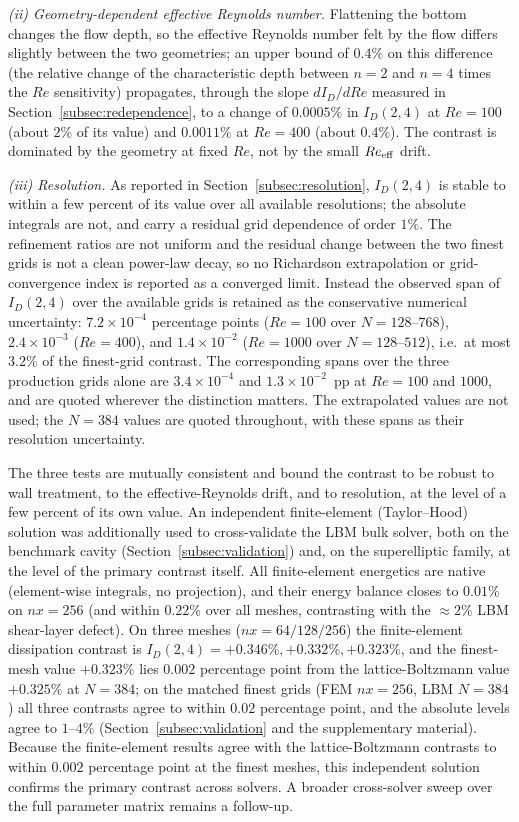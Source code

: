\emph{(ii) Geometry-dependent effective Reynolds number.} Flattening the bottom changes the flow depth, so the effective Reynolds number felt by the flow differs slightly between the two geometries; an upper bound of $0.4\%$ on this difference (the relative change of the characteristic depth between $n=2$ and $n=4$ times the $Re$ sensitivity) propagates, through the slope $dI_D/dRe$ measured in Section~\ref{subsec:redependence}, to a change of $0.0005\%$ in $I_D(2,4)$ at $Re=100$ (about $2\%$ of its value) and $0.0011\%$ at $Re=400$ (about $0.4\%$). The contrast is dominated by the geometry at fixed $Re$, not by the small $Re_{\rm eff}$ drift.

\emph{(iii) Resolution.} As reported in Section~\ref{subsec:resolution}, $I_D(2,4)$ is stable to within a few percent of its value over all available resolutions; the absolute integrals are not, and carry a residual grid dependence of order $1\%$. The refinement ratios are not uniform and the residual change between the two finest grids is not a clean power-law decay, so no Richardson extrapolation or grid-convergence index is reported as a converged limit. Instead the observed span of $I_D(2,4)$ over the available grids is retained as the conservative numerical uncertainty: $7.2\times10^{-4}$ percentage points ($Re=100$ over $N=128$--$768$), $2.4\times10^{-3}$ ($Re=400$), and $1.4\times10^{-2}$ ($Re=1000$ over $N=128$--$512$), i.e.\ at most $3.2\%$ of the finest-grid contrast. The corresponding spans over the three production grids alone are $3.4\times10^{-4}$ and $1.3\times10^{-2}$~pp at $Re=100$ and $1000$, and are quoted wherever the distinction matters. The extrapolated values are not used; the $N=384$ values are quoted throughout, with these spans as their resolution uncertainty.

The three tests are mutually consistent and bound the contrast to be robust to wall treatment, to the effective-Reynolds drift, and to resolution, at the level of a few percent of its own value. An independent finite-element (Taylor--Hood) solution was additionally used to cross-validate the LBM bulk solver, both on the benchmark cavity (Section~\ref{subsec:validation}) and, on the superelliptic family, at the level of the primary contrast itself. All finite-element energetics are native (element-wise integrals, no projection), and their energy balance closes to $0.01\%$ on $nx=256$ (and within $0.22\%$ over all meshes, contrasting with the $\approx 2\%$ LBM shear-layer defect). On three meshes ($nx=64/128/256$) the finite-element dissipation contrast is $I_D(2,4)=+0.346\%,+0.332\%,+0.323\%$, and the finest-mesh value $+0.323\%$ lies $0.002$ percentage point from the lattice-Boltzmann value $+0.325\%$ at $N=384$; on the matched finest grids (FEM $nx=256$, LBM $N=384$) all three contrasts agree to within $0.02$ percentage point, and the absolute levels agree to $1$--$4\%$ (Section~\ref{subsec:validation} and the supplementary material). Because the finite-element results agree with the lattice-Boltzmann contrasts to within $0.002$ percentage point at the finest meshes, this independent solution confirms the primary contrast across solvers. A broader cross-solver sweep over the full parameter matrix remains a follow-up.

